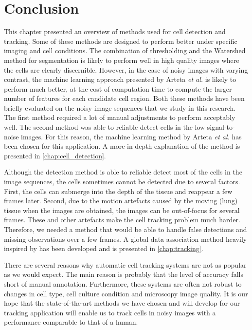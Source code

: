 \section{Conclusion \statusfirstdraft}
\label{sec:conclusionmethods}
This chapter presented an overview of methods used for cell detection and tracking. Some of these methods are designed to perform better under specific imaging and cell conditions. The combination of thresholding and the Watershed method for segmentation is likely to perform well in high quality images where the cells are clearly discernible. However, in the case of noisy images with varying contrast, the machine learning approach presented by Arteta \emph{et al.} is likely to perform much better, at the cost of computation time to compute the larger number of features for each candidate cell region. Both these methods have been briefly evaluated on the noisy image sequences that we study in this research. The first method required a lot of manual adjustments to perform acceptably well. The second method was able to reliable detect cells in the low signal-to-noise images. For this reason, the machine learning method by Arteta \emph{et al.} has been chosen for this application. A more in depth explanation of the method is presented in \cref{chap:cell_detection}.

Although the detection method is able to reliable detect most of the cells in the image sequences, the cells sometimes cannot be detected due to several factors. First, the cells can submerge into the depth of the tissue and reappear a few frames later. Second, due to the motion artefacts caused by the moving (lung) tissue when the images are obtained, the images can be out-of-focus for several frames. These and other artefacts make the cell tracking problem much harder. Therefore, we needed a method that would be able to handle false detections and missing observations over a few frames. A global data association method heavily inspired by \cite{bise11global} has been developed and is presented in \cref{chap:tracking}.

There are several reasons why automatic cell tracking systems are not as popular as we would expect. The main reason is probably that the level of accuracy falls short of manual annotation. Furthermore, these systems are often not robust to changes in cell type, cell culture condition and microscopy image quality. It is our hope that the state-of-the-art methods we have chosen and will develop for our tracking application will enable us to track cells in noisy images with a performance comparable to that of a human.